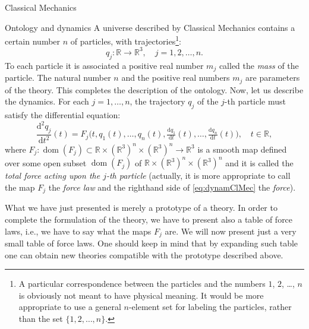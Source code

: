 \documentclass[oneside,a4paper,11pt]{amsbook}
\newcommand{\R}{\mathds R}
\newcommand{\dd}{\mathrm d}
\DeclareMathOperator{\Dom}{dom}
\theoremstyle{remark}\newtheorem{exercise}{Exercise}[chapter]
\theoremstyle{plain}\newtheorem{teo}{Theorem}[section]
\theoremstyle{plain}\newtheorem{lem}[teo]{Lemma}
\theoremstyle{plain}\newtheorem{prop}[teo]{Proposition}
\theoremstyle{plain}\newtheorem{cor}[teo]{Corollary}
\theoremstyle{definition}\newtheorem{defin}[teo]{Definition}
\theoremstyle{remark}\newtheorem{rem}[teo]{Remark}
\theoremstyle{definition}\newtheorem{notation}[teo]{Notation}
\theoremstyle{definition}\newtheorem{convention}[teo]{Convention}
\theoremstyle{definition}\newtheorem{example}[teo]{Example}
\numberwithin{section}{chapter}
\numberwithin{equation}{section}
\begin{document}
\begin{chapter}{Classical Mechanics}
\begin{section}{Ontology and dynamics}
A universe described by Classical Mechanics contains a certain
number $n$ of particles, with trajectories\footnote{%
A particular correspondence between the particles and the numbers $1$, $2$, \dots, $n$ is obviously not meant to have
physical meaning. It would be more appropriate to use a general $n$-element set for labeling the particles, rather
than the set $\{1,2,\ldots,n\}$.}:
\[q_j:\R\longrightarrow\R^3,\quad j=1,2,\ldots,n.\]
To each particle it is associated a positive real number $m_j$ called the {\em mass\/} of the particle. The natural
number $n$ and the positive real numbers $m_j$ are parameters of the theory. This completes the description of the
ontology. Now, let us describe the dynamics. For each $j=1,\ldots,n$, the trajectory $q_j$ of the $j$-th particle
must satisfy the differential equation:
\begin{equation}\label{eq:dynamClMec}
\frac{\dd^2q_j}{\dd t^2}(t)=F_j\big(t,q_1(t),\ldots,q_n(t),\tfrac{\dd q_1}{\dd t}(t),\ldots,
\tfrac{\dd q_n}{\dd t}(t)\big),\quad t\in\R,
\end{equation}
where $F_j:\Dom(F_j)\subset\R\times(\R^3)^n\times(\R^3)^n\to\R^3$ is a smooth map defined over some open
subset $\Dom(F_j)$ of $\R\times(\R^3)^n\times(\R^3)^n$ and
it is called the {\em total force acting upon the $j$-th particle\/}
(actually, it is more appropriate to call the map $F_j$ the {\em force law\/} and the righthand side
of \eqref{eq:dynamClMec} the {\em force}).

What we have just presented is merely a prototype of a theory. In order to complete the formulation of the
theory, we have to present also a table of force laws, i.e., we have to say what the maps $F_j$ are.
We will now present just a very small table of force laws. One should keep in mind that by expanding such table
one can obtain new theories compatible with the prototype described above.


\end{section}
\end{chapter}
\end{document}
